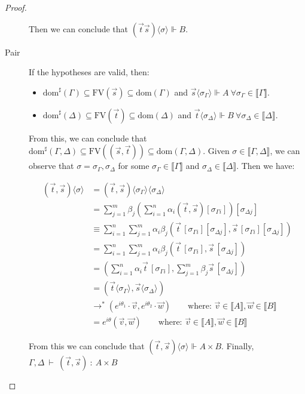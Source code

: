 \documentclass[runningheads,orivec,envcountsame,envcountsect]{llncs}
\newcommand\lra{\longrightarrow}
\newcommand\ansubst[2]{\ensuremath{\langle #1 \rangle_{#2}}}
\newcommand\dom[1]{\mathrm{dom}(#1)}
\newcommand\sdom[1]{\mathrm{dom}^{\sharp}(#1)}
\newcommand\FV[1]{\mathrm{FV}(#1)}
\def\Pair#1#2{(#1,#2)} %
\def\eval{\lra^*}
\def\sem#1{\llbracket#1\rrbracket}
\def\TYP#1#2#3{#1~{\vdash}~#2~{:}~#3}
\def\real{\Vdash}
\begin{document}
\begin{proof}
\begin{description}
    Then we can conclude that $(\vec{t}\vec{s})\ansubst{\sigma}{}\real B$.
    
    \item[Pair] If the hypotheses are valid, then:

    \begin{itemize}
        \item $\sdom{\Gamma}\subseteq \FV{\vec s}\subseteq \dom{\Gamma}$ and $\vec s \ansubst{\sigma_\Gamma}{}\Vdash A\ \forall \sigma_\Gamma\in\sem{\Gamma}$.
        \item $\sdom{\Delta}\subseteq \FV{\vec t}\subseteq \dom{\Delta}$ and $\vec t\ansubst{\sigma_\Delta}{}\Vdash B\ \forall \sigma_\Delta\in\sem{\Delta}$.
    \end{itemize}
    
    From this, we can conclude that $\sdom{\Gamma,\Delta}\subseteq \FV{(\vec s, \vec t)}\subseteq \dom{\Gamma,\Delta}$. Given $\sigma\in\sem{\Gamma,\Delta}$, we can observe that $\sigma=\sigma_\Gamma,\sigma_\Delta$ for some  $\sigma_\Gamma\in\sem{\Gamma}$ and $\sigma_\Delta\in\sem{\Delta}$. Then we have:

    \begin{align*}
        \Pair{\vec{t}}{\vec{s}}\ansubst{\sigma}{} &= \Pair{\vec{t}}{\vec{s}}\ansubst{\sigma_\Gamma}{}\ansubst{\sigma_\Delta}{}\\
        &=\sum_{j=1}^{m} \beta_j (\sum_{i=1}^{n} \alpha_i \Pair{\vec{t}}{\vec{s}}[\sigma_{\Gamma i}])[\sigma_{\Delta j}]\\
        &\equiv\sum_{i=1}^{n}\sum_{j=1}^{m} \alpha_i \beta_j \Pair{\vec{t}\,[\sigma_{\Gamma i}][\sigma_{\Delta j}]}{\vec{s}\,[\sigma_{\Gamma i}][\sigma_{\Delta j}]}\\
        &=\sum_{i=1}^{n}\sum_{j=1}^{m} \alpha_i \beta_j \Pair{\vec{t}\,[\sigma_{\Gamma i}]}{\vec{s}\,[\sigma_{\Delta j}]}\\
        &=\Pair{\sum_{i=1}^{n} \alpha_i \vec{t}\, [\sigma_{\Gamma i}]}{\sum_{j=1}^{m} \beta_j \vec{s}\, [\sigma_{\Delta j}]}\\
        &=\Pair{\vec{t}\ansubst{\sigma_\Gamma}{}}{\vec{s}\ansubst{\sigma_\Delta}{}}\\
        &\eval \Pair{e^{i\theta_1}\cdot\vec v}{e^{i\theta_2}\cdot\vec w}\qquad\text{where: }\vec{v}\in\sem{A}, \vec{w}\in\sem{B}\\
        &= e^{i\theta} \Pair{\vec{v}}{\vec{w}}\qquad\text{where: }\vec{v}\in\sem{A},\vec{w}\in\sem{B}
    \end{align*}
    
    From this we can conclude that $\Pair{\vec t}{\vec{s}}\ansubst{\sigma}{}\real A\times B$. Finally, $\TYP{\Gamma,\Delta}{\Pair{\vec{t}}{\vec{s}}}{A\times B}$
    

\end{description}
\end{proof}
\end{document}
